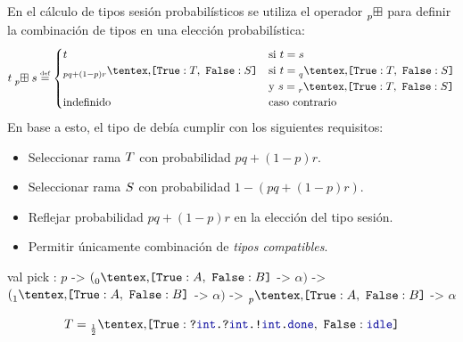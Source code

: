 \begin{frame}{\insertsection}
	En el cálculo de tipos sesión probabilísticos se utiliza el operador
	$\mathrel{\prescript{}{p}{\boxplus}}$ para definir la combinación de tipos en una elección probabilística:
	\begin{equation*}
	    \csum{t}{s}
	    \eqdef
	    \begin{cases}
	      t & \text{si $t = s$}
	      \\
	      \BinaryPChoice[pq+(1-p)r]{\SessionTypeT}{\SessionTypeS} & \text{si $t = \BinaryPChoice[q]{\SessionTypeT}{\SessionTypeS}$} \\ & \text{y $s = \BinaryPChoice[r]{\SessionTypeT}{\SessionTypeS}$}
	      \\
	      \text{indefinido} & \text{caso contrario}
	    \end{cases}
	\end{equation*}
	\pause
	En base a esto, el tipo de  debía cumplir con los siguientes requisitos:
	\begin{itemize}
		\item Seleccionar rama $T$ con probabilidad $pq + (1 - p)r$.
		\item Seleccionar rama $S$ con probabilidad $1 - (pq + (1 - p)r)$.
		\item Reflejar probabilidad $pq + (1 - p)r$ en la elección del tipo sesión.
		\item Permitir únicamente combinación de \emph{tipos compatibles}.
	\end{itemize}
\end{frame}

\begin{frame}[fragile]{\insertsection}
	\begin{table}[htb]
	    \begin{OCamlD}[basicstyle=\scriptsize,frame=single]
              val pick : $p$ -> $(\BinaryPChoice[0]{\etvarA}{\etvarB}$ -> $\alpha)$
                           -> $(\BinaryPChoice[1]{\etvarA}{\etvarB}$ -> $\alpha)$
                           -> $\BinaryPChoice[p]{\etvarA}{\etvarB}$ -> $\alpha$
	    \end{OCamlD}
	\end{table}
	\CoinFlipSumServer[basicstyle=\footnotesize]

	\begin{equation*}
		\SessionType = \BinaryPChoice[\frac{1}{2}]{
			\In\tint{\In\tint{\Out\tint{\Done}}}
			}{\Idle}
	\end{equation*}
\end{frame}

